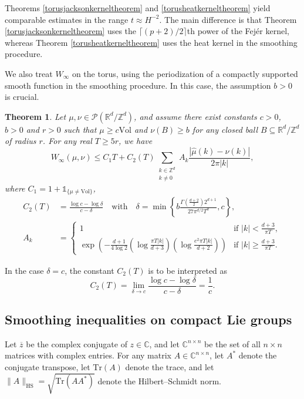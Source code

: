 \documentclass[11pt,a4paper]{article}
\newtheorem{thm}{Theorem}
\theoremstyle{definition}
\begin{document}
Theorems \ref{torusjacksonkerneltheorem} and \ref{torusheatkerneltheorem} yield comparable estimates in the range $t \approx H^{-2}$. The main difference is that Theorem \ref{torusjacksonkerneltheorem} uses the $\lceil (p+2)/2 \rceil$th power of the Fej\'er kernel, whereas Theorem \ref{torusheatkerneltheorem} uses the heat kernel in the smoothing procedure.

We also treat $W_{\infty}$ on the torus, using the periodization of a compactly supported smooth function in the smoothing procedure. In this case, the assumption $b>0$ is crucial.
\begin{thm}\label{torusinfinitytheorem} Let $\mu, \nu \in \mathcal{P}(\mathbb{R}^d / \mathbb{Z}^d)$, and assume there exist constants $c>0$, $b>0$ and $r>0$ such that $\mu \ge c \mathrm{Vol}$ and $\nu (B) \ge b$ for any closed ball $B \subseteq \mathbb{R}^d / \mathbb{Z}^d$ of radius $r$. For any real $T \ge 5r$, we have
\[ W_{\infty}(\mu, \nu) \le C_1 T + C_2(T) \sum_{\substack{k \in \mathbb{Z}^d \\ k \neq 0}} A_k \frac{|\widehat{\mu}(k) - \widehat{\nu}(k)|}{2 \pi |k|}, \]
where $C_1 = 1+\mathds{1}_{\{ \mu \neq \mathrm{Vol} \}}$,
\[ \begin{split} C_2(T) &= \frac{\log c - \log \delta}{c-\delta} \quad \textrm{with} \quad \delta= \min \left\{ b \frac{\Gamma \left(\frac{d+2}{2} \right) 2^{d+1}}{27 \pi^{d/2} T^d}, c\right\}, \\ A_k &= \left\{ \begin{array}{ll} 1 & \textrm{if } |k| < \frac{d+3}{\pi T}, \\ \displaystyle{\exp \left( - \frac{d+1}{4 \log 2} \left( \log \frac{\pi T |k|}{d+3} \right) \left( \log \frac{e^2 \pi T |k|}{d+2} \right) \right)} & \textrm{if } |k| \ge \frac{d+3}{\pi T} . \end{array} \right. \end{split} \]
\end{thm}
\noindent In the case $\delta=c$, the constant $C_2(T)$ is to be interpreted as
\[ C_2(T)=\lim_{\delta \to c} \frac{\log c - \log \delta}{c-\delta} = \frac{1}{c} . \]

\subsection{Smoothing inequalities on compact Lie groups}\label{liegroupsection}

Let $\overline{z}$ be the complex conjugate of $z \in \mathbb{C}$, and let $\mathbb{C}^{n \times n}$ be the set of all $n \times n$ matrices with complex entries. For any matrix $A \in \mathbb{C}^{n \times n}$, let $A^*$ denote the conjugate transpose, let $\mathrm{Tr} (A)$ denote the trace, and let $\| A \|_{\mathrm{HS}} = \sqrt{\mathrm{Tr}(A A^*)}$ denote the Hilbert--Schmidt norm.
\end{document}
